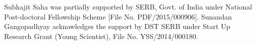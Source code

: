 \documentclass[two-column, nofootinbib]{revtex4-1}
\begin{document}

\begin{acknowledgments}
Subhajit Saha was partially supported by SERB, Govt. of India under National Post-doctoral Fellowship Scheme [File No. PDF/2015/000906]. Sunandan Gangopadhyay acknowledges the support by DST SERB under Start Up Research Grant (Young Scientist), File No. YSS/2014/000180.
\end{acknowledgments}


\frenchspacing
\end{document}
